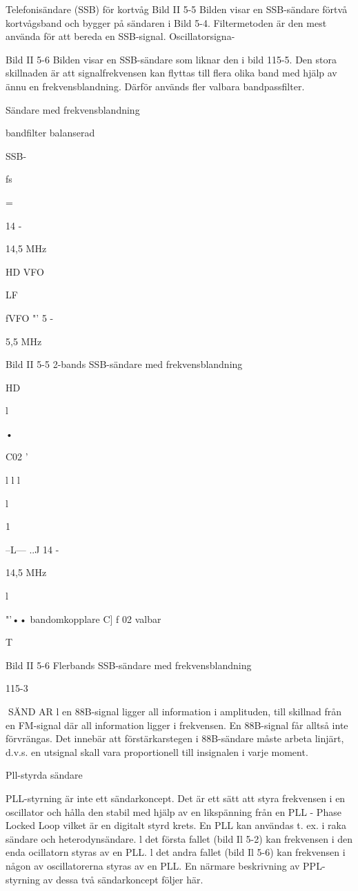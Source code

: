 Telefonisändare (SSB) för kortvåg
Bild II 5-5
Bilden visar en SSB-sändare förtvå kortvågsband och bygger på sändaren i Bild 5-4.
Filtermetoden är den mest använda för
att bereda en SSB-signal. Oscillatorsigna-

Bild II 5-6
Bilden visar en SSB-sändare som liknar den
i bild 115-5. Den stora skillnaden är att signalfrekvensen kan flyttas till flera olika band
med hjälp av ännu en frekvensblandning.
Därför används fler valbara bandpassfilter.

Sändare med frekvensblandning

bandfilter
balanserad

SSB-

fs

=

14 -

14,5 MHz

HD
VFO

LF

fVFO "' 5 -

5,5 MHz

Bild II 5-5 2-bands SSB-sändare med frekvensblandning

HD

l

•

C02
'

l
l
l

l

1

--L---  ..J
14 -

14,5 MHz

l

"'•• bandomkopplare
C] f
02 valbar

T

Bild II 5-6 Flerbands SSB-sändare med frekvensblandning

115-3

SÄND AR
l en 88B-signal ligger all information i
amplituden, till skillnad från en FM-signal
där all information ligger i frekvensen. En
88B-signal får alltså inte förvrängas. Det
innebär att förstärkarstegen i 88B-sändare
måste arbeta linjärt, d.v.s. en utsignal skall
vara proportionell till insignalen i varje moment.

Pll-styrda sändare

PLL-styrning är inte ett sändarkoncept. Det
är ett sätt att styra frekvensen i en oscillator
och hålla den stabil med hjälp av en likspänning från en PLL - Phase Locked Loop vilket är en digitalt styrd krets.
En PLL kan användas t. ex. i raka sändare och heterodynsändare. l det första fallet
(bild Il 5-2) kan frekvensen i den enda ocillatorn styras av en PLL. l det andra fallet
(bild Il 5-6) kan frekvensen i någon av oscillatorerna styras av en PLL.
En närmare beskrivning av PPL-styrning
av dessa två sändarkoncept följer här.

